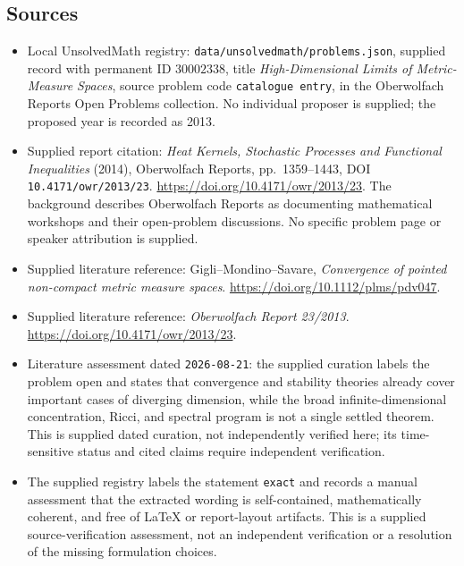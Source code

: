 \documentclass[11pt]{article}
\begin{document}
\subsection{Sources}
\begin{itemize}
\item Local UnsolvedMath registry: \texttt{data/unsolvedmath/problems.json}, supplied record with permanent ID \(30002338\), title \emph{High-Dimensional Limits of Metric-Measure Spaces}, source problem code \texttt{catalogue entry}, in the Oberwolfach Reports Open Problems collection. No individual proposer is supplied; the proposed year is recorded as 2013.
\item Supplied report citation: \emph{Heat Kernels, Stochastic Processes and Functional Inequalities} (2014), Oberwolfach Reports, pp.~1359--1443, DOI \texttt{10.4171/owr/2013/23}. \url{https://doi.org/10.4171/owr/2013/23}. The background describes Oberwolfach Reports as documenting mathematical workshops and their open-problem discussions. No specific problem page or speaker attribution is supplied.
\item Supplied literature reference: Gigli--Mondino--Savare, \emph{Convergence of pointed non-compact metric measure spaces}. \url{https://doi.org/10.1112/plms/pdv047}.
\item Supplied literature reference: \emph{Oberwolfach Report 23/2013}. \url{https://doi.org/10.4171/owr/2013/23}.
\item Literature assessment dated \texttt{2026-08-21}: the supplied curation labels the problem open and states that convergence and stability theories already cover important cases of diverging dimension, while the broad infinite-dimensional concentration, Ricci, and spectral program is not a single settled theorem. This is supplied dated curation, not independently verified here; its time-sensitive status and cited claims require independent verification.
\item The supplied registry labels the statement \texttt{exact} and records a manual assessment that the extracted wording is self-contained, mathematically coherent, and free of LaTeX or report-layout artifacts. This is a supplied source-verification assessment, not an independent verification or a resolution of the missing formulation choices.
\end{itemize}
\end{document}
